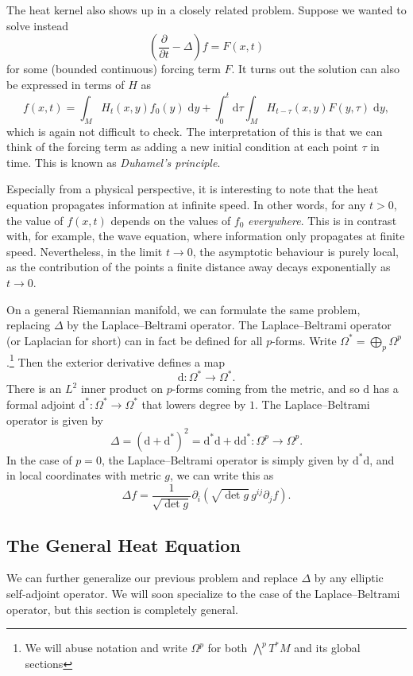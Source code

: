 \documentclass{shortart}
\theoremstyle{definition}
\renewcommand\d{\mathrm{d}}
\begin{document}
The heat kernel also shows up in a closely related problem. Suppose we wanted to solve instead
\[
  \left(\frac{\partial}{\partial t} - \Delta\right)f = F(x, t)
\]
for some (bounded continuous) forcing term $F$. It turns out the solution can also be expressed in terms of $H$ as
\[
  f(x, t) = \int_M H_t(x, y) f_0(y)\;\d y + \int_0^t \d \tau \int_M H_{t - \tau}(x, y) F(y, \tau) \;\d y,
\]
which is again not difficult to check. The interpretation of this is that we can think of the forcing term as adding a new initial condition at each point $\tau$ in time. This is known as \emph{Duhamel's principle}.

Especially from a physical perspective, it is interesting to note that the heat equation propagates information at infinite speed. In other words, for any $t > 0$, the value of $f(x, t)$ depends on the values of $f_0$ \emph{everywhere}. This is in contrast with, for example, the wave equation, where information only propagates at finite speed. Nevertheless, in the limit $t \to 0$, the asymptotic behaviour is purely local, as the contribution of the points a finite distance away decays exponentially as $t \to 0$.

On a general Riemannian manifold, we can formulate the same problem, replacing $\Delta$ by the Laplace--Beltrami operator. The Laplace--Beltrami operator (or Laplacian for short) can in fact be defined for all $p$-forms. Write $\Omega^* = \bigoplus_p \Omega^p$.\footnote{We will abuse notation and write $\Omega^p$ for both $\bigwedge^p T^*M$ and its global sections} Then the exterior derivative defines a map
\[
  \d\colon \Omega^* \to \Omega^*.
\]
There is an $L^2$ inner product on $p$-forms coming from the metric, and so $\d$ has a formal adjoint $\d^*\colon \Omega^* \to \Omega^*$ that lowers degree by $1$. The Laplace--Beltrami operator is given by
\[
  \Delta = (\d + \d^*)^2 = \d^* \d + \d \d^* \colon \Omega^p \to \Omega^p.
\]
In the case of $p = 0$, the Laplace--Beltrami operator is simply given by $\d^* \d$, and in local coordinates with metric $g$, we can write this as
\[
  \Delta f = \frac{1}{\sqrt{\det g}} \partial_i (\sqrt{\det g}\, g^{ij} \partial_j f).
\]

\subsection{The General Heat Equation}
We can further generalize our previous problem and replace $\Delta$ by any elliptic self-adjoint operator. We will soon specialize to the case of the Laplace--Beltrami operator, but this section is completely general.
\end{document}
